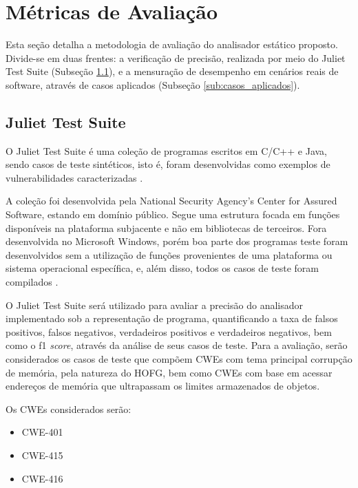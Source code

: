 \documentclass[
    12pt,                %
    openright,           %
    oneside,             %
    a4paper,             %
    english,             %
    brazil               %
]{abntex2}
\begin{document}
\section{Métricas de Avaliação}
\label{sec:metricas_de_avaliacao}

Esta seção detalha a metodologia de avaliação do analisador estático proposto. Divide-se em duas frentes: a verificação de precisão, 
realizada por meio do Juliet Test Suite (Subseção \ref{sub:juliet_test_suite}), e a mensuração de desempenho em cenários reais de software, através de casos aplicados (Subseção \ref{sub:casos_aplicados}).

\subsection{Juliet Test Suite}
\label{sub:juliet_test_suite}

O Juliet Test Suite é uma coleção de programas escritos em C/C++ e Java, sendo casos de teste sintéticos, isto é, foram desenvolvidas como exemplos de vulnerabilidades caracterizadas \cite{Boland2012}.
\par

A coleção foi desenvolvida pela National Security Agency's Center for Assured Software, estando em domínio público. Segue uma estrutura focada em funções disponíveis na plataforma subjacente e não em bibliotecas de terceiros. 
Fora desenvolvida no Microsoft Windows, porém boa parte dos programas teste foram desenvolvidos sem a utilização de funções provenientes de uma plataforma ou sistema operacional específica, e, além disso, todos os casos de teste foram compilados \cite{Boland2012}.

\par
O Juliet Test Suite será utilizado para avaliar a precisão do analisador implementado sob a representação de programa, quantificando a taxa de falsos positivos, falsos negativos, verdadeiros positivos e verdadeiros negativos, bem como o f1 \textit{score}, 
através da análise de seus casos de teste. Para a avaliação, serão considerados os casos de teste que compõem CWEs com tema principal corrupção de memória, pela natureza do HOFG, bem como CWEs com base em acessar endereços de memória que ultrapassam os limites armazenados de objetos.

\par
Os CWEs considerados serão:
\begin{itemize}
\item CWE-401
\item CWE-415
\item CWE-416
\end{itemize}
\end{document}
